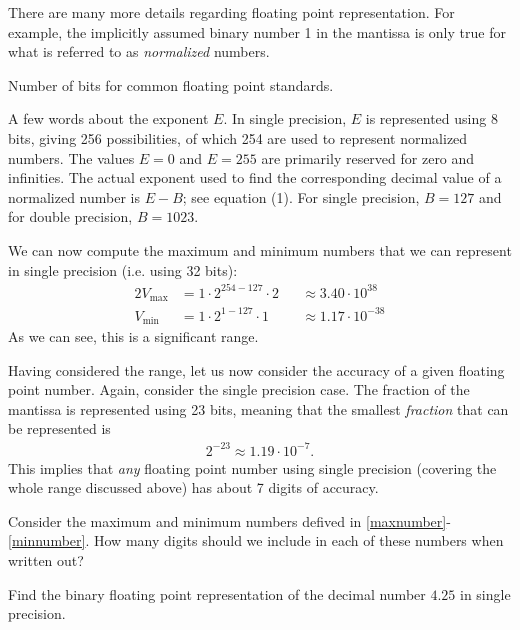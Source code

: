 There are many more details regarding floating point representation. For
example, the implicitly assumed binary number 1 in the mantissa is only true for
what is referred to as {\em normalized} numbers.

\begin{table}
  \centering
  \caption{Number of bits for common floating point standards.}
  
\end{table}

A few words about the exponent $E$. In single precision, $E$ is represented
using 8 bits, giving 256 possibilities, of which 254 are used to represent
normalized numbers. The values $E=0$ and $E=255$ are primarily reserved for zero
and infinities. The actual exponent used to find the corresponding decimal value
of a normalized number is $E-B$; see equation (1). For single precision,
$B=127$ and for double precision, $B=1023$.

We can now compute the maximum and minimum numbers that we can represent in
single precision (i.e. using 32 bits):
\begin{alignat}{2}
  \label{maxnumber}
  V_{\text{max}} &= 1 \cdot 2^{254-127} \cdot 2 &&\approx 3.40 \cdot 10^{38} \\
  \label{minnumber}
  V_{\text{min}} &= 1\cdot 2^{1-127} \cdot 1 &&\approx 1.17 \cdot 10^{-38}
\end{alignat}
As we can see, this is a significant range.

Having considered the range, let us now consider the accuracy of a given
floating point number. Again, consider the single precision case. The fraction
of the mantissa is represented using 23 bits, meaning that the smallest {\em
fraction} that can be represented is
\begin{align*}
  2^{-23} \approx 1.19 \cdot 10^{-7}.
\end{align*}
This implies that {\em any} floating point number using single precision
(covering the whole range discussed above) has about 7 digits of accuracy.

\begin{ex}
  Consider the maximum and minimum numbers defived in
  \eqref{maxnumber}-\eqref{minnumber}. How many digits should we include in each
  of these numbers when written out?
\end{ex}

\begin{ex}
  Find the binary floating point representation of the decimal number $4.25$ in
  single precision.
\end{ex}


